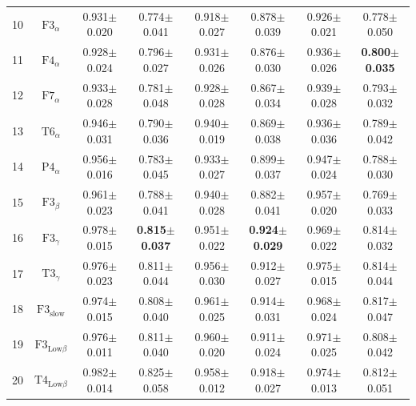 \documentclass[pdflatex,sn-mathphys]{sn-jnl}%
\theoremstyle{thmstyleone}%
\theoremstyle{thmstyletwo}%
\theoremstyle{thmstylethree}%
\begin{document}
\begin{appendices}
\begin{table}[h!]
{\begin{tabular}{r|ccccccc}
  10 &            $\text{F3}_{\alpha}$ &          0.931$\pm$0.020 &          0.774$\pm$0.041 &          0.918$\pm$0.027 &          0.878$\pm$0.039 &          0.926$\pm$0.021 &          0.778$\pm$0.050 \\
  11 &            $\text{F4}_{\alpha}$ &          0.928$\pm$0.024 &          0.796$\pm$0.027 &          0.931$\pm$0.026 &          0.876$\pm$0.030 &          0.936$\pm$0.026 & \textbf{0.800$\pm$0.035} \\
  12 &            $\text{F7}_{\alpha}$ &          0.933$\pm$0.028 &          0.781$\pm$0.048 &          0.928$\pm$0.028 &          0.867$\pm$0.034 &          0.939$\pm$0.028 &          0.793$\pm$0.032 \\
  13 &            $\text{T6}_{\alpha}$ &          0.946$\pm$0.031 &          0.790$\pm$0.036 &          0.940$\pm$0.019 &          0.869$\pm$0.038 &          0.936$\pm$0.036 &          0.789$\pm$0.042 \\
  14 &            $\text{P4}_{\alpha}$ &          0.956$\pm$0.016 &          0.783$\pm$0.045 &          0.933$\pm$0.027 &          0.899$\pm$0.037 &          0.947$\pm$0.024 &          0.788$\pm$0.030 \\
  15 &             $\text{F3}_{\beta}$ &          0.961$\pm$0.023 &          0.788$\pm$0.041 &          0.940$\pm$0.028 &          0.882$\pm$0.041 &          0.957$\pm$0.020 &          0.769$\pm$0.033 \\
  16 &            $\text{F3}_{\gamma}$ &          0.978$\pm$0.015 & \textbf{0.815$\pm$0.037} &          0.951$\pm$0.022 & \textbf{0.924$\pm$0.029} &          0.969$\pm$0.022 &          0.814$\pm$0.032 \\
  17 &            $\text{T3}_{\gamma}$ &          0.976$\pm$0.023 &          0.811$\pm$0.044 &          0.956$\pm$0.030 &          0.912$\pm$0.027 &          0.975$\pm$0.015 &          0.814$\pm$0.044 \\
  18 &         $\text{F3}_\text{slow}$ &          0.974$\pm$0.015 &          0.808$\pm$0.040 &          0.961$\pm$0.025 &          0.914$\pm$0.031 &          0.968$\pm$0.024 &          0.817$\pm$0.047 \\
  19 &   $\text{F3}_{\text{Low}\beta}$ &          0.976$\pm$0.011 &          0.811$\pm$0.040 &          0.960$\pm$0.020 &          0.911$\pm$0.024 &          0.971$\pm$0.025 &          0.808$\pm$0.042 \\
  20 &   $\text{T4}_{\text{Low}\beta}$ &          0.982$\pm$0.014 &          0.825$\pm$0.058 &          0.958$\pm$0.012 &          0.918$\pm$0.027 &          0.974$\pm$0.013 &          0.812$\pm$0.051 \\

\end{tabular}}
\end{table}
\end{appendices}
\end{document}
